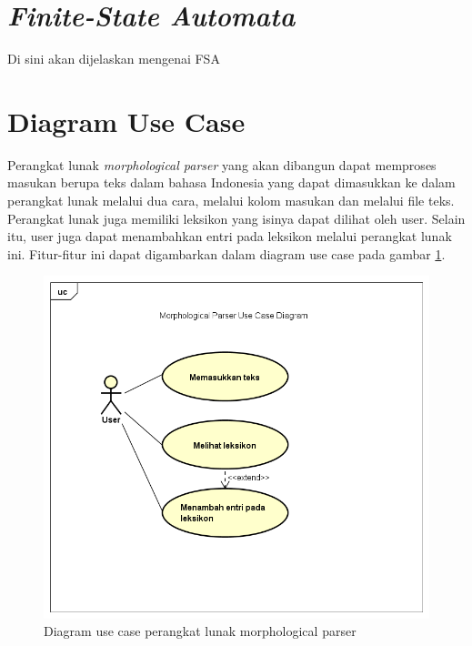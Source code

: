 \section{\textit{Finite-State Automata}}
\label{sec:fsa}

Di sini akan dijelaskan mengenai FSA


\section{Diagram Use Case}
\label{sec:DiagramUseCaseAwal}

Perangkat lunak \textit{morphological parser} yang akan dibangun dapat memproses masukan berupa teks dalam bahasa Indonesia yang dapat dimasukkan ke dalam perangkat lunak melalui dua cara, melalui kolom masukan dan melalui file teks. Perangkat lunak juga memiliki leksikon yang isinya dapat dilihat oleh user. Selain itu, user juga dapat menambahkan entri pada leksikon melalui perangkat lunak ini. Fitur-fitur ini dapat digambarkan dalam diagram use case pada gambar \ref{gambar-diagram-use-case-awal}.
		
\begin{figure}[H]
\centering
\includegraphics[scale=0.56]{Gambar/gambar-diagram-use-case-awal}
\caption[Diagram use case perangkat lunak morphological parser]{Diagram use case perangkat lunak morphological parser} 
\label{gambar-diagram-use-case-awal}
\end{figure}

